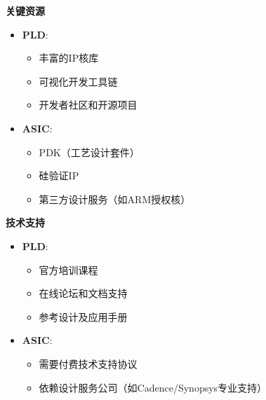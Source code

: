 \documentclass[
  ignorenonframetext,
  chinese,
]{beamer}
\providecommand{\tightlist}{%
  \setlength{\itemsep}{0pt}\setlength{\parskip}{0pt}}
\begin{document}
\begin{frame}
\textbf{关键资源}

\begin{itemize}
\tightlist
\item
  \textbf{PLD}:

  \begin{itemize}
  \tightlist
  \item
    丰富的IP核库\\
  \item
    可视化开发工具链\\
  \item
    开发者社区和开源项目\\
  \end{itemize}
\item
  \textbf{ASIC}:

  \begin{itemize}
  \tightlist
  \item
    PDK（工艺设计套件）\\
  \item
    硅验证IP\\
  \item
    第三方设计服务（如ARM授权核）
  \end{itemize}
\end{itemize}
\end{frame}

\begin{frame}
\textbf{技术支持}

\begin{itemize}
\tightlist
\item
  \textbf{PLD}:

  \begin{itemize}
  \tightlist
  \item
    官方培训课程\\
  \item
    在线论坛和文档支持\\
  \item
    参考设计及应用手册\\
  \end{itemize}
\item
  \textbf{ASIC}:

  \begin{itemize}
  \tightlist
  \item
    需要付费技术支持协议\\
  \item
    依赖设计服务公司（如Cadence/Synopsys专业支持）
  \end{itemize}
\end{itemize}
\end{frame}
\end{document}
